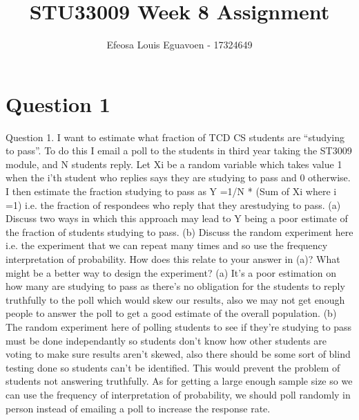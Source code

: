 \documentclass[11pt]{article} %
\title{STU33009 Week 8 Assignment}
\author{Efeosa Louis Eguavoen - 17324649}
\begin{document}
\maketitle

\section{Question 1}
Question 1. I want to estimate what fraction of TCD CS students are “studying to pass”.
To do this I email a poll to the students in third year taking the ST3009 module, and N students reply. Let Xi be a random variable which takes value 1 when the i’th student who replies says they are studying to pass and 0 otherwise. I then estimate the fraction studying to pass as Y =1/N * (Sum of Xi where i =1)
i.e. the fraction of respondees who reply that they arestudying to pass.
\newline
(a) Discuss two ways in which this approach may lead to Y being a poor estimate of the fraction of students studying to pass.
\newline
(b) Discuss the random experiment here i.e. the experiment that we can repeat many times and so use the frequency interpretation of probability. How does this relate to your answer in (a)? What might be a better way to design the experiment?
\newline
\newline
(a) It's a poor estimation on how many are studying to pass as there's no obligation for the students to reply truthfully to the poll which would skew our results, also we may not get enough people to answer the poll to get a good estimate of the overall population.
\newline
(b) The random experiment here of polling students to see if they're studying to pass must be done independantly so students don't know how other students are voting to make sure results aren't skewed, also there should be some sort of blind testing done so students can't be identified. This would prevent the problem of students not answering truthfully. As for getting a large enough sample size so we can use the frequency of interpretation of probability, we should poll randomly in person instead of emailing a poll to increase the response rate.
\end{document}
